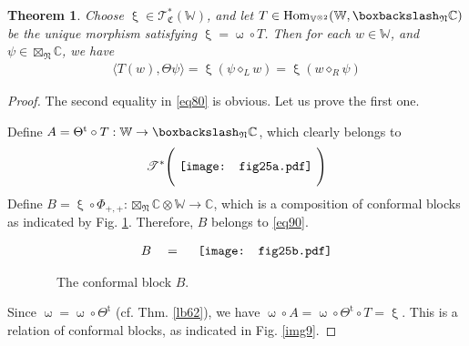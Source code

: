 \documentclass[11pt,b5paper,notitlepage]{article}
\theoremstyle{definition}
\theoremstyle{plain}
\newtheorem{thm}[df]{Theorem}
\newcommand{\fk}{\mathfrak}
\newcommand{\tr}{\mathrm{t}} %
\newcommand{\Hom}{\mathrm{Hom}}
\newcommand{\Vbb}{\mathbb V}
\newcommand{\Wbb}{\mathbb W}
\newcommand{\Cbb}{\mathbb C}
\newcommand{\<}{\left\langle}
\renewcommand{\>}{\right\rangle}
\newcommand{\ST}{\mathscr{T}}
\newcommand{\bk}[1]{\langle {#1}\rangle}
\newcommand{\bbs}{\boxbackslash}
\newcommand{\fn}{\mathfrak{N}}
\numberwithin{equation}{section}
\begin{document}
\begin{thm}\label{lb64}
Choose $\upxi\in\ST^*_{\fk C}(\Wbb)$, and let $T\in\Hom_{\Vbb^{\otimes 2}}(\Wbb,\bbs_\fn\Cbb)$ be the unique morphism satisfying $\upxi=\upomega\circ T$. Then for each $w\in\Wbb$, and $\psi\in\boxtimes_\fn\Cbb$, we have
\begin{align}\label{eq80}
\bk{T(w),\Theta\psi}=\upxi(\psi\diamond_Lw)=\upxi(w\diamond_R\psi)
\end{align}
\end{thm}

\begin{proof}
The second equality in \eqref{eq80} is obvious. Let us prove the first one. 

Define $A=\Theta^\tr\circ T:\Wbb\rightarrow\bbs_\fn\Cbb$,
which clearly belongs to
\begin{align}\label{eq90}
\ST^*\Bigg(\vcenter{\hbox{{
				   \texttt{[image: fig25a.pdf]}}}}~\Bigg)
\end{align}
Define $B=\upxi\circ\Phi_{+,+}:\boxtimes_\fn\Cbb\otimes\Wbb\rightarrow\Cbb$, which is a composition of conformal blocks as indicated by Fig. \ref{img8}. Therefore, $B$ belongs to \eqref{eq90}.

\begin{figure}[h]
	\centering
\begin{align*}
B\quad=\quad\vcenter{\hbox{{
				   \texttt{[image: fig25b.pdf]}}}}
\end{align*}
\caption{~~The conformal block $B$.}
	\label{img8}
\end{figure}

Since $\upomega=\upomega\circ\Theta^\tr$ (cf. Thm. \ref{lb62}), we have $\upomega\circ A=\upomega\circ\Theta^\tr\circ T=\upxi$. This is a relation of conformal blocks, as indicated in Fig. \ref{img9}.


\end{proof}
\end{document}
